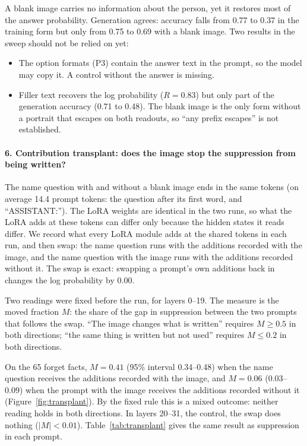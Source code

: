 \documentclass[11pt]{article}
\begin{document}
A blank image carries no information about the person, yet it restores most of the answer
probability. Generation agrees: accuracy falls from 0.77 to 0.37 in the training form but
only from 0.75 to 0.69 with a blank image. Two results in the sweep should not be relied
on yet:
\begin{itemize}
\item The option formats (P3) contain the answer text in the prompt, so the model may copy
it. A control without the answer is missing.
\item Filler text recovers the log probability ($R=0.83$) but only part of the generation
accuracy (0.71 to 0.48). The blank image is the only form without a portrait that escapes
on both readouts, so ``any prefix escapes'' is not established.
\end{itemize}

\paragraph{6. Contribution transplant: does the image stop the suppression from being written?}
The name question with and without a blank image ends in the same tokens (on average 14.4
prompt tokens: the question after its first word, and ``ASSISTANT:''). The LoRA weights
are identical in the two runs, so what the LoRA adds at these tokens can differ only
because the hidden states it reads differ. We record what every LoRA module adds at the
shared tokens in each run, and then swap: the name question runs with the additions
recorded with the image, and the name question with the image runs with the additions
recorded without it. The swap is exact: swapping a prompt's own additions back in changes
the log probability by 0.00.

Two readings were fixed before the run, for layers 0--19. The measure is the moved
fraction $M$: the share of the gap in suppression between the two prompts that follows the
swap. ``The image changes what is written'' requires $M\ge0.5$ in both directions; ``the
same thing is written but not used'' requires $M\le0.2$ in both directions.

On the 65 forget facts, $M=0.41$ (95\% interval 0.34--0.48) when the name question
receives the additions recorded with the image, and $M=0.06$ (0.03--0.09) when the prompt
with the image receives the additions recorded without it
(Figure~\ref{fig:transplant}). By the fixed rule this is a mixed outcome: neither reading
holds in both directions. In layers 20--31, the control, the swap does nothing
($|M|<0.01$). Table~\ref{tab:transplant} gives the same result as suppression in each
prompt.
\end{document}
